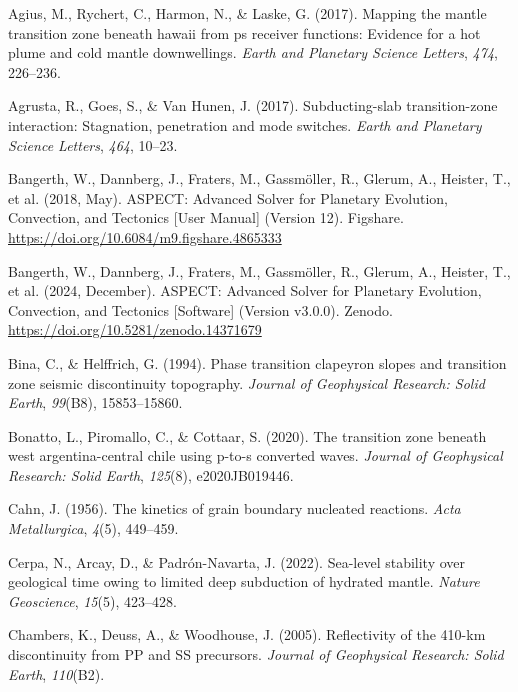 \documentclass[draft,linenumbers]{agujournal2019}
\newlength{\cslhangindent}
\newenvironment{CSLReferences}[2]
 {\begin{list}{}{
  \setlength{\itemindent}{0pt}
  \setlength{\leftmargin}{0pt}
  \setlength{\parsep}{0pt}
  \ifodd #1
   \setlength{\leftmargin}{\cslhangindent}
   \setlength{\itemindent}{-\cslhangindent}
  \fi
  \setlength{\itemsep}{#2\baselineskip}
  }
  \item\relax}
 {\end{list}}
\begin{document}
\protect{}\label{refs}
\begin{CSLReferences}{1}{0}
Agius, M., Rychert, C., Harmon, N., \& Laske, G. (2017). Mapping the
mantle transition zone beneath hawaii from ps receiver functions:
Evidence for a hot plume and cold mantle downwellings. \emph{Earth and
Planetary Science Letters}, \emph{474}, 226--236.

Agrusta, R., Goes, S., \& Van Hunen, J. (2017). Subducting-slab
transition-zone interaction: Stagnation, penetration and mode switches.
\emph{Earth and Planetary Science Letters}, \emph{464}, 10--23.

Bangerth, W., Dannberg, J., Fraters, M., Gassmöller, R., Glerum, A.,
Heister, T., et al. (2018, May). {ASPECT: Advanced Solver for Planetary
Evolution, Convection, and Tectonics {[}User Manual{]}} (Version 12).
Figshare. \url{https://doi.org/10.6084/m9.figshare.4865333}

Bangerth, W., Dannberg, J., Fraters, M., Gassmöller, R., Glerum, A.,
Heister, T., et al. (2024, December). {ASPECT: Advanced Solver for
Planetary Evolution, Convection, and Tectonics {[}Software{]}} (Version
v3.0.0). Zenodo. \url{https://doi.org/10.5281/zenodo.14371679}

Bina, C., \& Helffrich, G. (1994). Phase transition clapeyron slopes and
transition zone seismic discontinuity topography. \emph{Journal of
Geophysical Research: Solid Earth}, \emph{99}(B8), 15853--15860.

Bonatto, L., Piromallo, C., \& Cottaar, S. (2020). The transition zone
beneath west argentina-central chile using p-to-s converted waves.
\emph{Journal of Geophysical Research: Solid Earth}, \emph{125}(8),
e2020JB019446.

Cahn, J. (1956). The kinetics of grain boundary nucleated reactions.
\emph{Acta Metallurgica}, \emph{4}(5), 449--459.

Cerpa, N., Arcay, D., \& Padrón-Navarta, J. (2022). Sea-level stability
over geological time owing to limited deep subduction of hydrated
mantle. \emph{Nature Geoscience}, \emph{15}(5), 423--428.

Chambers, K., Deuss, A., \& Woodhouse, J. (2005). Reflectivity of the
410-km discontinuity from PP and SS precursors. \emph{Journal of
Geophysical Research: Solid Earth}, \emph{110}(B2).


\end{CSLReferences}
\end{document}
